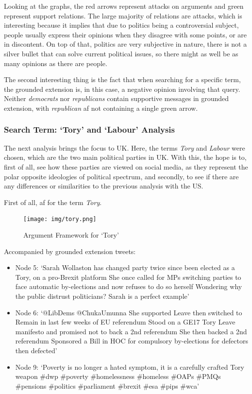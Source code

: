             Looking at the graphs, the red arrows represent attacks on arguments and green represent support relations. The large majority of relations are attacks, which is interesting because it implies that due to politics being a controversial subject, people usually express their opinions when they disagree with some points, or are in discontent. On top of that, politics are very subjective in nature, there is not a silver bullet that can solve current political issues, so there might as well be as many opinions as there are people.
            
            The second interesting thing is the fact that when searching for a specific term, the grounded extension is, in this case, a negative opinion involving that query. Neither \textit{democrats} nor \textit{republicans} contain supportive messages in grounded extension, with \textit{republican} \gls{af} not containing a single green arrow.
        
        \subsubsection{Search Term: `Tory' and `Labour' Analysis} \label{ukanalysis}
            The next analysis brings the focus to UK. Here, the terms \textit{Tory} and \textit{Labour} were chosen, which are the two main political parties in UK. With this, the hope is to, first of all, see how these parties are viewed on social media, as they represent the polar opposite ideologies of political spectrum, and secondly, to see if there are any differences or similarities to the previous analysis with the US.
            
            First of all, \gls{af} for the term \textit{Tory}.
            \begin{figure}[!htbp]
                \centering
                \texttt{[image: img/tory.png]}
                \caption{Argument Framework for `Tory'}
                \label{fig:tory}
            \end{figure}
            \FloatBarrier
            
            Accompanied by grounded extension tweets:
            \begin{itemize}
                \item Node 5: `Sarah Wollaston has changed party twice since been elected as a Tory, on a pro-Brexit platform   She once called for MPs switching parties to face automatic by-elections and now refuses to do so herself   Wondering why the public distrust politicians? Sarah is a perfect example'
                \item Node 6: `@LibDems @ChukaUmunna She supported Leave then switched to Remain in last few weeks of EU referendum  Stood on a GE17 Tory Leave manifesto and promised not to back a 2nd referendum  She then backed a 2nd referendum  Sponsored a Bill in HOC for compulsory by-elections for defectors then  defected'
                \item Node 9: `Poverty is no longer a hated symptom, it is a carefully crafted Tory weapon \#dwp \#poverty \#homelessness \#homeless \#OAPs \#PMQs \#pensions \#politics \#parliament \#brexit \#esa \#pips \#wca'
            \end{itemize}
            
